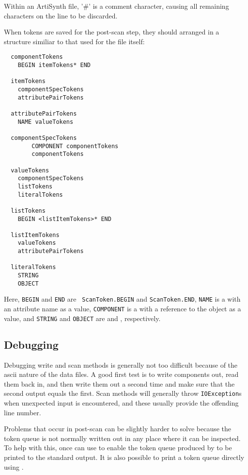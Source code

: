 \documentclass{article}
\begin{document}
Within an ArtiSynth file, '\#' is a comment character, causing all
remaining characters on the line to be discarded.

When tokens are saved for the post-scan step, they 
should arranged in a structure similiar to that used
for the file itself:
\begin{lstlisting}
  componentTokens
	BEGIN itemTokens* END

  itemTokens
	componentSpecTokens
	attributePairTokens

  attributePairTokens
	NAME valueTokens

  componentSpecTokens
        COMPONENT componentTokens
        componentTokens

  valueTokens
	componentSpecTokens
	listTokens
	literalTokens

  listTokens
	BEGIN <listItemTokens>* END

  listItemTokens
	valueTokens
	attributePairTokens

  literalTokens
	STRING
	OBJECT
\end{lstlisting}
Here, {\tt BEGIN} and {\tt END} are {\tt
ScanToken.BEGIN} and {\tt ScanToken.END}, {\tt NAME} is a
 with an attribute name as
a value, {\tt COMPONENT} is a
 with a reference to the
object as a value, and {\tt STRING} and {\tt OBJECT} are
 and
, respectively.

\subsection{Debugging}

Debugging write and scan methods is generally not too difficult
because of the ascii nature of the data files. A good first test is to
write components out, read them back in, and then write them out a
second time and make sure that the second output equals the
first. Scan methods will generally throw {\tt IOException}s when
unexpected input is encountered, and these usually provide the
offending line number. 

Problems that occur in post-scan can be slightly harder to solve
because the token queue is not normally written out in any place where it can
be inspected. To help with this, once can use
to enable the token queue produced by
 to be
printed to the standard output. It is also possible to print a token
queue directly using 
.
\end{document}
